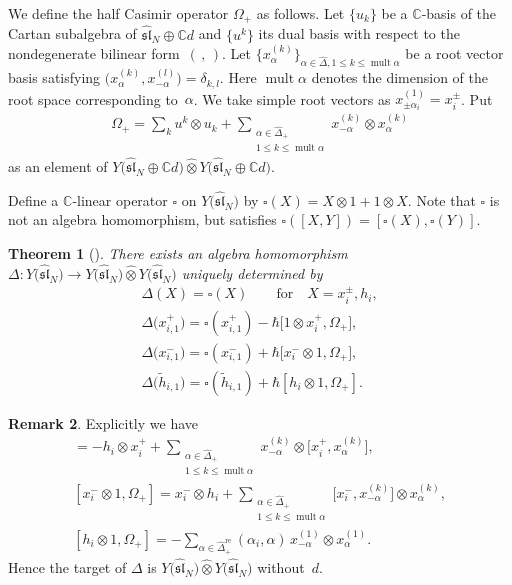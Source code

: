 \documentclass[11pt]{article}
\newtheorem{thm}{Theorem}[section]
\theoremstyle{definition}
\newtheorem{rem}[thm]{Remark}
\numberwithin{equation}{section}
\DeclareMathOperator{\mult}{mult}
\newcommand{\bbC}{\mathbb{C}}
\newcommand{\affY}{Y\big(\affsl\big)}
\newcommand{\affsl}{\hat{\mathfrak{sl}}_N}
\begin{document}
We define the half Casimir operator $\Omega_+$ as follows. Let $\{u_k\}$ be a $\bbC$-basis of the Cartan subalgebra of $\affsl \oplus \bbC d$ and $\big\{u^k\big\}$ its dual basis with respect to the nondegenerate bilinear form~$(\, ,\, )$. Let $\big\{x_{\alpha}^{(k)}\big\}_{\alpha \in \hat{\Delta}, 1 \leq k \leq \mult \alpha}$ be a root vector basis satisfying $\big(x_{\alpha}^{(k)},x_{-\alpha}^{(l)}\big) = \delta_{k,l}$. Here $\mult \alpha$ denotes the dimension of the root space corresponding to~$\alpha$. We take simple root vectors as $x_{\pm \alpha_i}^{(1)} = x_i^{\pm}$. Put
\begin{gather*}
\Omega_+ = \sum_{k} u^k \otimes u_k + \sum_{\substack{\alpha \in \hat{\Delta}_+ \\ 1 \leq k \leq \mult \alpha}} x_{-\alpha}^{(k)} \otimes x_{\alpha}^{(k)}
\end{gather*}
as an element of $Y\big(\affsl \oplus \bbC d\big) \widehat{\otimes} Y\big(\affsl \oplus \bbC d\big)$.

Define a $\bbC$-linear operator $\square$ on $\affY$ by $\square(X) = X \otimes 1 + 1 \otimes X$. Note that $\square$ is not an algebra homomorphism, but satisfies $\square([X,Y]) = [\square(X), \square(Y)]$.
\begin{thm}[{\cite[Definition~4.6, Theorem~4.9, Proposition~5.18, Section~7]{MR3861718}}]\label{thm:definition_of_coproduct} There exists an algebra homomorphism $\Delta \colon \affY \to \affY \widehat{\otimes} \affY$ uniquely determined by
\begin{gather*}
\Delta(X) = \square(X) \qquad \text{for} \quad X=x_{i}^{\pm}, h_i,\\
\Delta\big(x_{i,1}^+\big) = \square(x_{i,1}^+) - \hbar \big[1 \otimes x_i^+, \Omega_+\big],\\
\Delta\big(x_{i,1}^-\big) = \square(x_{i,1}^-) + \hbar \big[x_i^- \otimes 1, \Omega_+\big],\\
\Delta\big(\tilde{h}_{i,1}\big)= \square(\tilde{h}_{i,1}) + \hbar [h_i \otimes 1, \Omega_+].
\end{gather*}
\end{thm}
\begin{rem}Explicitly we have
\begin{gather*}
[1 \otimes x_i^+, \Omega_+] = -h_i \otimes x_i^+ + \sum_{\substack{\alpha \in \hat{\Delta}_+\\ 1 \leq k \leq \mult \alpha}} x_{-\alpha}^{(k)} \otimes \big[x_i^+, x_{\alpha}^{(k)}\big],
\\
[x_i^- \otimes 1, \Omega_+] = x_i^- \otimes h_i + \sum_{\substack{\alpha \in \hat{\Delta}_+\\ 1 \leq k \leq \mult \alpha}} \big[x_i^-, x_{-\alpha}^{(k)}\big] \otimes x_{\alpha}^{(k)},
\\
[h_i \otimes 1, \Omega_+] = - \sum_{\alpha \in \hat{\Delta}_+^{\mathrm{re}}} (\alpha_i,\alpha)\, x_{-\alpha}^{(1)} \otimes x_{\alpha}^{(1)}.
\end{gather*}
Hence the target of $\Delta$ is $\affY \widehat{\otimes} \affY$ without~$d$.
\end{rem}
\end{document}
